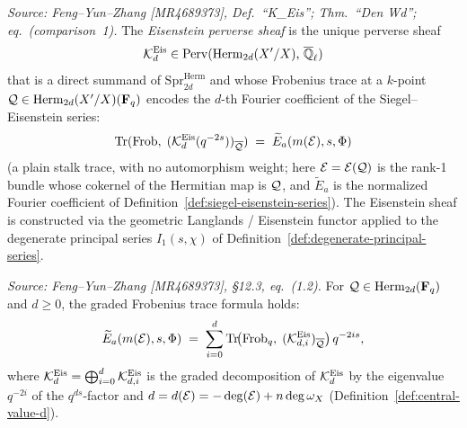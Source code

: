 \begin{definition}
  \label{def:K-Eis}
  \textit{Source: Feng--Yun--Zhang [MR4689373], Def.~``K\_Eis''; Thm.~``Den Wd''; eq.~(comparison~1).}
  The \emph{Eisenstein perverse sheaf} is the unique perverse sheaf
  \[
    \mathcal{K}_d^{\mathrm{Eis}} \in \mathrm{Perv}(\operatorname{Herm}_{2d}(X'/X),\, \overline{\mathbb{Q}}_\ell)
  \]
  that is a direct summand of \(\mathrm{Spr}^{\mathrm{Herm}}_{2d}\) and whose
  Frobenius trace at a \(k\)-point \(\mathcal{Q} \in \operatorname{Herm}_{2d}(X'/X)(\mathbf{F}_q)\)
  encodes the \(d\)-th Fourier coefficient of the Siegel--Eisenstein series:
  \[
    \operatorname{Tr}(\operatorname{Frob},\; (\mathcal{K}_d^{\mathrm{Eis}}(q^{-2s}))_{\overline{\mathcal{Q}}})
    \;=\;
    \widetilde{E}_a(m(\mathcal{E}), s, \Phi)
  \]
  (a plain stalk trace, with no automorphism weight; here \(\mathcal{E} = \mathcal{E}(\mathcal{Q})\) is the
  rank-1 bundle whose cokernel of the Hermitian map is \(\mathcal{Q}\), and
  \(\widetilde{E}_a\) is the normalized Fourier coefficient of
  Definition~\ref{def:siegel-eisenstein-series}).
  The Eisenstein sheaf is constructed via the geometric Langlands / Eisenstein functor
  applied to the degenerate principal series \(I_1(s, \chi)\) of
  Definition~\ref{def:degenerate-principal-series}.
\end{definition}

\begin{theorem}
  \label{thm:trace-Eis}
  \textit{Source: Feng--Yun--Zhang [MR4689373], \S12.3, eq.~(1.2).}
  For \(\mathcal{Q} \in \operatorname{Herm}_{2d}(\mathbf{F}_q)\) and \(d \geq 0\), the graded Frobenius
  trace formula holds:
  \[
    \widetilde{E}_a(m(\mathcal{E}), s, \Phi)
    \;=\;
    \sum_{i=0}^{d}
    \operatorname{Tr}\!\bigl(\operatorname{Frob}_q,\; (\mathcal{K}^{\mathrm{Eis}}_{d,i})_{\overline{\mathcal{Q}}}\bigr)\, q^{-2is},
  \]
  where \(\mathcal{K}^{\mathrm{Eis}}_d = \bigoplus_{i=0}^d \mathcal{K}^{\mathrm{Eis}}_{d,i}\) is the
  graded decomposition of \(\mathcal{K}_d^{\mathrm{Eis}}\) by the eigenvalue \(q^{-2i}\) of the
  \(q^{ds}\)-factor and \(d = d(\mathcal{E}) = -\deg(\mathcal{E}) + n\deg\omega_X\)
  (Definition~\ref{def:central-value-d}).
\end{theorem}

